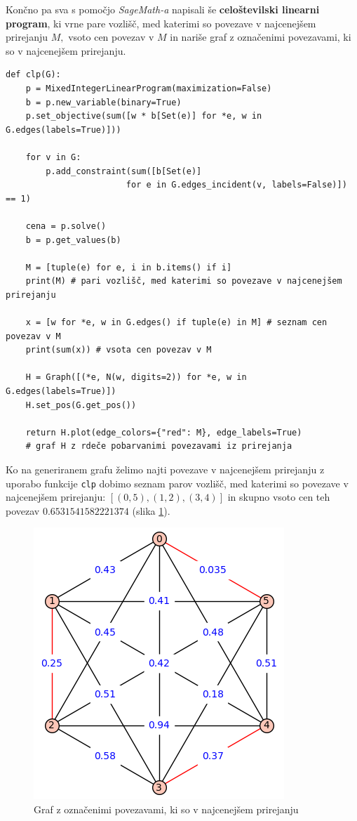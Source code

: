 \documentclass[a4paper, 11pt]{article}
\begin{document}
Končno pa sva s pomočjo \emph{SageMath-a} napisali še \textbf{celoštevilski linearni program}, 
ki vrne pare vozlišč, med katerimi so povezave v najcenejšem prirejanju $M,$ vsoto cen povezav v $M$ 
in nariše graf z označenimi povezavami, ki so v najcenejšem prirejanju.

\small
\begin{verbatim}
def clp(G):
    p = MixedIntegerLinearProgram(maximization=False)
    b = p.new_variable(binary=True)
    p.set_objective(sum([w * b[Set(e)] for *e, w in G.edges(labels=True)]))

    for v in G:
        p.add_constraint(sum([b[Set(e)] 
                        for e in G.edges_incident(v, labels=False)]) == 1)

    cena = p.solve()
    b = p.get_values(b)

    M = [tuple(e) for e, i in b.items() if i]
    print(M) # pari vozlišč, med katerimi so povezave v najcenejšem prirejanju

    x = [w for *e, w in G.edges() if tuple(e) in M] # seznam cen povezav v M
    print(sum(x)) # vsota cen povezav v M

    H = Graph([(*e, N(w, digits=2)) for *e, w in G.edges(labels=True)])
    H.set_pos(G.get_pos())

    return H.plot(edge_colors={"red": M}, edge_labels=True) 
    # graf H z rdeče pobarvanimi povezavami iz prirejanja
\end{verbatim}
\normalsize

Ko na generiranem grafu želimo najti povezave v najcenejšem prirejanju z uporabo funkcije \texttt{clp} dobimo
seznam parov vozlišč, med katerimi so povezave v najcenejšem prirejanju: \texttt{$[(0, 5), (1, 2), (3, 4)]$} in skupno vsoto cen teh povezav $0.6531541582221374$ (slika \ref{fig:graf1clp}).

\begin{figure}[h!]
    \includegraphics[scale=0.5]{graf1clp}
    \centering
    \caption{Graf z označenimi povezavami, ki so v najcenejšem prirejanju}
    \label{fig:graf1clp}
\end{figure}
\end{document}
